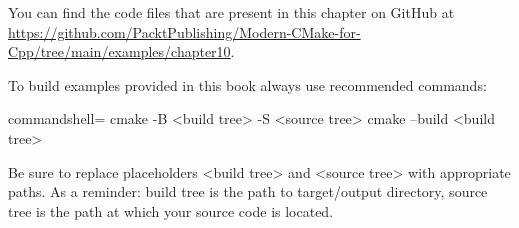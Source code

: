 You can find the code files that are present in this chapter on GitHub at \url{https://github.com/PacktPublishing/Modern-CMake-for-Cpp/tree/main/examples/chapter10}.

To build examples provided in this book always use recommended commands:

\begin{tcblisting}{commandshell={}}
cmake -B <build tree> -S <source tree>
cmake --build <build tree>
\end{tcblisting}

Be sure to replace placeholders <build tree> and <source tree> with appropriate paths. As a reminder: build tree is the path to target/output directory, source tree is the path at which your source code is located.